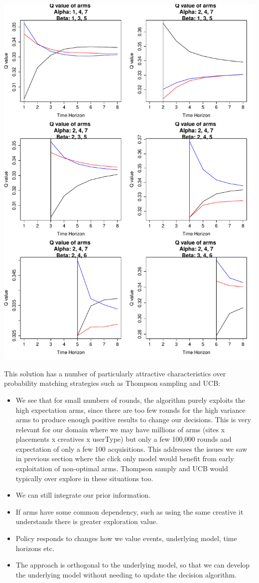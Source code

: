 \documentclass[11pt,a4,singlespacing,titlepagenumber=on]{scrreprt}
\numberwithin{equation}{chapter} %
\theoremstyle{remark}
\begin{document}
\includegraphics[scale=0.7]{BARLillustration.pdf}

This solution has a number of particularly attractive characteristics over probability matching strategies such as Thompson sampling and UCB:
\begin{itemize}
	\item We see that for small numbers of rounds, the algorithm purely exploits the high expectation arms, since there are too few rounds for the high variance arms to produce enough positive results to change our decisions. This is very relevant for our domain where we may have millions of arms (sites x placements x creatives x userType) but only a few 100,000 rounds and expectation of only a few 100 acquisitions. This addresses the issues we saw in previous section where the click only model would benefit from early exploitation of non-optimal arms. Thompson samply and UCB would typically over explore in these situations too.
	\item We can still integrate our prior information.
	\item If arms have some common dependency, such as using the same creative it understands there is greater exploration value.
	\item Policy responds to changes how we value events, underlying model, time horizons etc.
	\item The approach is orthogonal to the underlying model, so that we can develop the underlying model without needing to update the decision algorithm.
\end{itemize}
\end{document}
